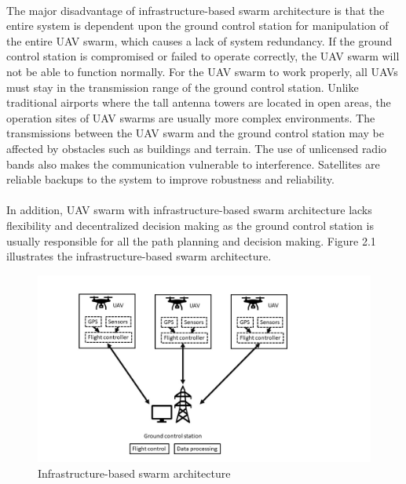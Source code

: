 \documentclass[a4paper,12pt]{report}
\begin{document}
\paragraph{}
The major disadvantage of infrastructure-based swarm architecture is that the entire system is dependent upon the ground control station for manipulation of the entire UAV swarm, which causes a lack of system redundancy\cite{doi:10.1139/juvs-2018-0009}. If the ground control station is compromised or failed to operate correctly, the UAV swarm will not be able to function normally. For the UAV swarm to work properly, all UAVs must stay in the transmission range of the ground control station. Unlike traditional airports where the tall antenna towers are located in open areas, the operation sites of UAV swarms are usually more complex environments. The transmissions between the UAV swarm and the ground control station may be affected by obstacles such as buildings and terrain\cite{7470933}. The use of unlicensed radio bands also makes the communication vulnerable to interference\cite{doi:10.1139/juvs-2018-0009}. Satellites are reliable backups to the system to improve robustness and reliability\cite{7470933}.

\paragraph{}
In addition, UAV swarm with infrastructure-based swarm architecture lacks flexibility and decentralized decision making as the ground control station is usually responsible for all the path planning and decision making\cite{doi:10.1139/juvs-2018-0009}. Figure 2.1 illustrates the infrastructure-based swarm architecture.

\begin{figure}[h]
\begin{center}
\includegraphics[width=1.2\linewidth]{images/infra.jpg}
\caption{Infrastructure-based swarm architecture}
\end{center}
\end{figure}
\end{document}
